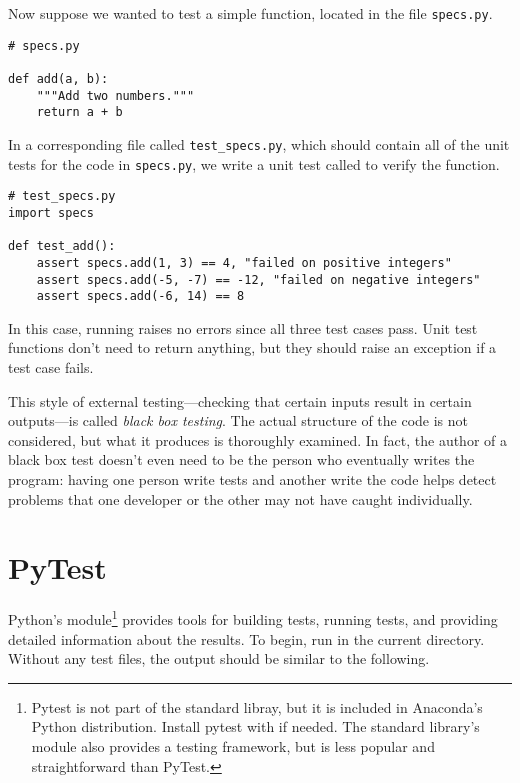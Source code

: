Now suppose we wanted to test a simple  function, located in the file \texttt{specs.py}.

\begin{lstlisting}
# specs.py

def add(a, b):
    """Add two numbers."""
    return a + b
\end{lstlisting}

In a corresponding file called \texttt{test\_specs.py}, which should contain all of the unit tests for the code in \texttt{specs.py}, we write a unit test called  to verify the  function.

\begin{lstlisting}
# test_specs.py
import specs

def test_add():
    assert specs.add(1, 3) == 4, "failed on positive integers"
    assert specs.add(-5, -7) == -12, "failed on negative integers"
    assert specs.add(-6, 14) == 8
\end{lstlisting}

In this case, running  raises no errors since all three test cases pass.
Unit test functions don't need to return anything, but they should raise an exception if a test case fails.

\begin{info} %
This style of external testing---checking that certain inputs result in certain outputs---is called \emph{black box testing}.
The actual structure of the code is not considered, but what it produces is thoroughly examined.
In fact, the author of a black box test doesn't even need to be the person who eventually writes the program: having one person write tests and another write the code helps detect problems that one developer or the other may not have caught individually.
\end{info}

\section*{PyTest} %

Python's  module\footnote{Pytest is not part of the standard libray, but it is included in Anaconda's Python distribution. Install pytest with  if needed. The standard library's  module also provides a testing framework, but is less popular and straightforward than PyTest.} provides tools for building tests, running tests, and providing detailed information about the results.
To begin, run  in the current directory.
Without any test files, the output should be similar to the following.

